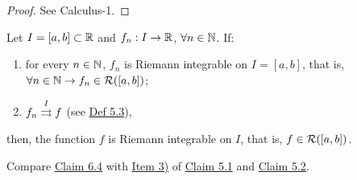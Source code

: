\begin{proof}
See Calculus-1.
\end{proof}

\begin{claim}\label{claim:6.4}
Let $I=[a,b]\subset\mathbb{R}$ and $f_n:I\to\mathbb{R}$, $\forall n\in\mathbb{N}$.
If:
\begin{enumerate}[label=\alph*)]
    \item\label{item:claim:6.4:a} for every $n\in\mathbb{N}$, $f_n$ is Riemann integrable on $I=[a,b]$, that is, $\forall n\in\mathbb{N}\to f_n\in\mathcal{R}([a,b])$;
    \item\label{item:claim:6.4:b} $f_n\mathrel{\overset{I}{\rightrightarrows}}f$ \quad (see \hyperref[def:5.3]{Def 5.3}),
\end{enumerate}
then, the function $f$ is Riemann integrable on $I$, that is, $f\in\mathcal{R}([a,b])$.
\end{claim}

Compare \hyperref[claim:6.4]{Claim 6.4} with \hyperref[item:claim:5.1:3]{Item 3)} of \hyperref[claim:5.1]{Claim 5.1} and \hyperref[claim:5.2]{Claim 5.2}.

